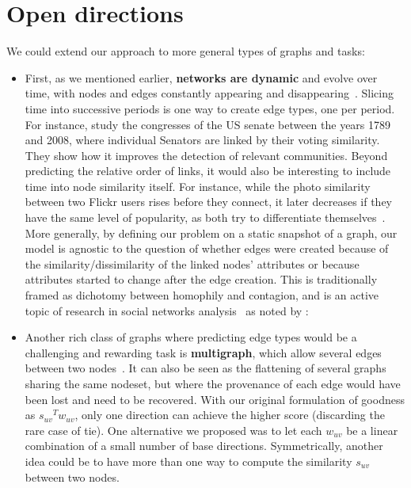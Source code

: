 \section{Open directions}
\label{sec:edge_conc}

We could extend our approach to more general types of graphs and tasks:

\begin{itemize}[leftmargin=*]

  \item First, as we mentioned earlier, \textbf{networks are dynamic} and evolve over time, with
    nodes and edges constantly appearing and disappearing~\autocite{networkEvolution14}. Slicing
    time into successive periods is one way to create edge types, one per period. For instance,
    \textcite{TimedUSSenate10} study the  congresses of the US senate between the years 1789
    and 2008, where  individual Senators are linked by their voting similarity. They show
    how it improves the detection of relevant communities. Beyond predicting the relative order of
    links, it would also be interesting to include time into node similarity itself.
    For instance, while the photo similarity between two Flickr users rises before they connect, it
    later decreases if they have the same level of popularity, as both try to differentiate
    themselves~\autocite{dynamicFlickr13}.
    More generally, by defining our problem on a static snapshot of a graph, our model is agnostic
    to the question of whether edges were created because of the similarity/dissimilarity of
    the linked nodes' attributes or because attributes started to change after the edge creation.
    This is traditionally framed as dichotomy between homophily and contagion, and is an active topic
    of research in social networks analysis~\autocites{InfluenceVsHomo08}{ConfoundedHomophily11} as
    noted by \textcite{OSNreview14}: 

  \item Another rich class of graphs where predicting edge types would be a challenging and rewarding
    task is \textbf{multigraph}, which allow several edges between two
    nodes~\autocite{typedMultigraph11}. It can also be seen as
    the flattening of several graphs sharing the same nodeset, but where the provenance of each edge
    would have been lost and need to be recovered. With our original formulation of goodness as
    ${s_{uv}}^T w_{uv}$, only one direction can achieve the higher score (discarding the rare case
    of tie). One alternative we proposed was to let each $w_{uv}$ be a linear combination of a small
    number of base directions.
    Symmetrically, another idea could be to have more than one way to compute the similarity
    $s_{uv}$ between two nodes.


\end{itemize}
